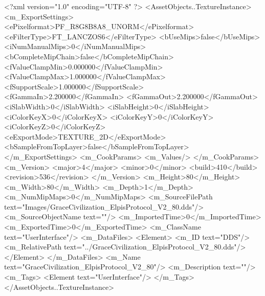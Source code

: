 <?xml version="1.0" encoding="UTF-8" ?>
<AssetObjects..TextureInstance>
	<m_ExportSettings>
		<ePixelformat>PF_R8G8B8A8_UNORM</ePixelformat>
		<eFilterType>FT_LANCZOS6</eFilterType>
		<bUseMips>false</bUseMips>
		<iNumManualMips>0</iNumManualMips>
		<bCompleteMipChain>false</bCompleteMipChain>
		<fValueClampMin>0.000000</fValueClampMin>
		<fValueClampMax>1.000000</fValueClampMax>
		<fSupportScale>1.000000</fSupportScale>
		<fGammaIn>2.200000</fGammaIn>
		<fGammaOut>2.200000</fGammaOut>
		<iSlabWidth>0</iSlabWidth>
		<iSlabHeight>0</iSlabHeight>
		<iColorKeyX>0</iColorKeyX>
		<iColorKeyY>0</iColorKeyY>
		<iColorKeyZ>0</iColorKeyZ>
		<eExportMode>TEXTURE_2D</eExportMode>
		<bSampleFromTopLayer>false</bSampleFromTopLayer>
	</m_ExportSettings>
	<m_CookParams>
		<m_Values/>
	</m_CookParams>
	<m_Version>
		<major>4</major>
		<minor>0</minor>
		<build>410</build>
		<revision>536</revision>
	</m_Version>
	<m_Height>80</m_Height>
	<m_Width>80</m_Width>
	<m_Depth>1</m_Depth>
	<m_NumMipMaps>0</m_NumMipMaps>
	<m_SourceFilePath text="Images/GraceCivilization_ElpisProtocol_V2_80.dds"/>
	<m_SourceObjectName text=""/>
	<m_ImportedTime>0</m_ImportedTime>
	<m_ExportedTime>0</m_ExportedTime>
	<m_ClassName text="UserInterface"/>
	<m_DataFiles>
		<Element>
			<m_ID text="DDS"/>
			<m_RelativePath text="../GraceCivilization_ElpisProtocol_V2_80.dds"/>
		</Element>
	</m_DataFiles>
	<m_Name text="GraceCivilization_ElpisProtocol_V2_80"/>
	<m_Description text=""/>
	<m_Tags>
		<Element text="UserInterface"/>
	</m_Tags>
</AssetObjects..TextureInstance>
